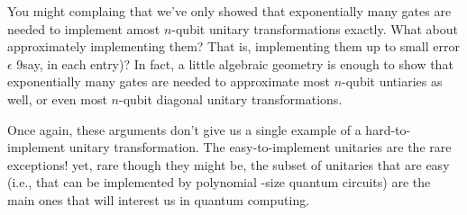 You might complaing that we've only showed that exponentially many gates are needed to implement amost $n$-qubit unitary transformations exactly. What about approximately implementing them? That is, implementing them up to small error $\epsilon$ 9say, in each entry)? In fact, a little algebraic geometry is enough to show that exponentially many gates are needed to approximate most $n$-qubit untiaries as well, or even most $n$-qubit diagonal unitary transformations. 

Once again, these arguments don't give us a single example of a hard-to-implement unitary transformation. The easy-to-implement unitaries are the rare exceptions! yet, rare though they might be, the subset of unitaries that are easy (i.e., that can be implemented by polynomial -size quantum circuits) are the main ones that will interest us in quantum computing.

